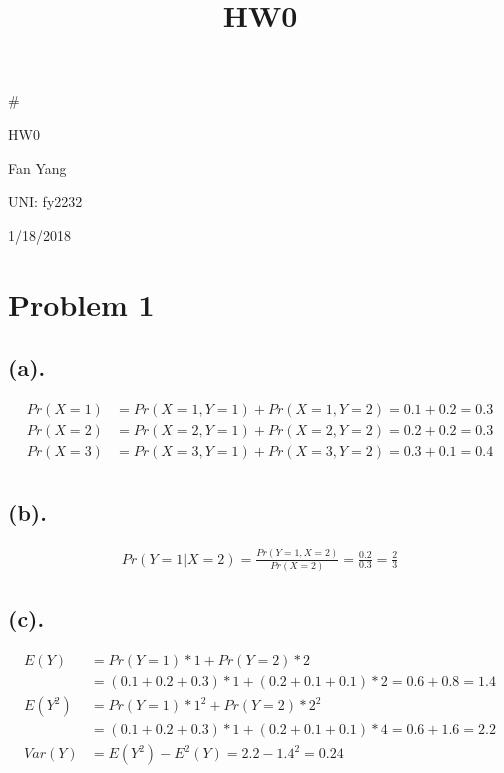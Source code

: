\documentclass[11pt]{article}
\title{HW0}
\begin{document}
    
    
    \maketitle
    
    

    
    \#

HW0

Fan Yang

UNI: fy2232

1/18/2018

    \hypertarget{problem-1}{%
\section{Problem 1}\label{problem-1}}

    \hypertarget{a.}{%
\subsection{(a).}\label{a.}}

\begin{align*}
Pr(X=1)&=Pr(X=1,Y=1)+Pr(X=1,Y=2)=0.1+0.2=0.3\\
Pr(X=2)&=Pr(X=2,Y=1)+Pr(X=2,Y=2)=0.2+0.2=0.3\\
Pr(X=3)&=Pr(X=3,Y=1)+Pr(X=3,Y=2)=0.3+0.1=0.4\\
\end{align*}

    \hypertarget{b.}{%
\subsection{(b).}\label{b.}}

\begin{align*}
Pr(Y = 1 | X = 2) = \frac{Pr(Y=1,X=2)}{Pr(X=2)}=\frac{0.2}{0.3}=\frac{2}{3}
\end{align*}

    \hypertarget{c.}{%
\subsection{(c).}\label{c.}}

\begin{align*}
E(Y) &= Pr(Y=1)*1+Pr(Y=2)*2\\&=(0.1+0.2+0.3)*1+(0.2+0.1+0.1)*2=0.6+0.8=1.4\\
E(Y^2)&=Pr(Y=1)*1^2+Pr(Y=2)*2^2\\&=(0.1+0.2+0.3)*1+(0.2+0.1+0.1)*4=0.6+1.6=2.2\\
Var(Y)&=E(Y^2)-E^2(Y)=2.2-1.4^2=0.24
\end{align*}
\end{document}
